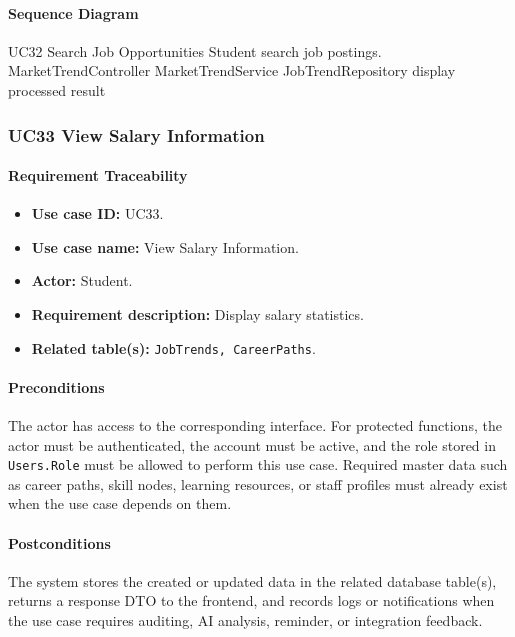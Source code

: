 \paragraph{Sequence Diagram}

\SequenceDiagram
{UC32 Search Job Opportunities}
{Student}
{search job postings.}
{MarketTrendController}
{MarketTrendService}
{JobTrendRepository}
{display processed result}

\subsubsection{UC33 View Salary Information}

\paragraph{Requirement Traceability}

\begin{itemize}
    \item \textbf{Use case ID:} UC33.
    \item \textbf{Use case name:} View Salary Information.
    \item \textbf{Actor:} Student.
    \item \textbf{Requirement description:} Display salary statistics.
    \item \textbf{Related table(s):} \texttt{JobTrends, CareerPaths}.
\end{itemize}

\paragraph{Preconditions}

The actor has access to the corresponding interface. For protected functions, the actor must be authenticated, the account must be active, and the role stored in \texttt{Users.Role} must be allowed to perform this use case. Required master data such as career paths, skill nodes, learning resources, or staff profiles must already exist when the use case depends on them.

\paragraph{Postconditions}

The system stores the created or updated data in the related database table(s), returns a response DTO to the frontend, and records logs or notifications when the use case requires auditing, AI analysis, reminder, or integration feedback.

